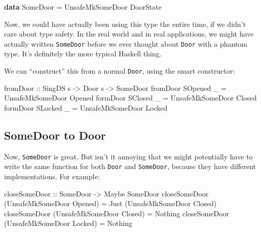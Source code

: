 \documentclass[]{article}
\newenvironment{Shaded}{}{}
\newcommand{\KeywordTok}[1]{\textcolor[rgb]{0.00,0.44,0.13}{\textbf{#1}}}
\newcommand{\DataTypeTok}[1]{\textcolor[rgb]{0.56,0.13,0.00}{#1}}
\newcommand{\OtherTok}[1]{\textcolor[rgb]{0.00,0.44,0.13}{#1}}
\newcommand{\FunctionTok}[1]{\textcolor[rgb]{0.02,0.16,0.49}{#1}}
\newcommand{\NormalTok}[1]{#1}
\begin{document}
\begin{Shaded}
\begin{Highlighting}[]
\KeywordTok{data} \DataTypeTok{SomeDoor} \FunctionTok{=} \DataTypeTok{UnsafeMkSomeDoor} \DataTypeTok{DoorState}
\end{Highlighting}
\end{Shaded}

Now, we could have actually been using this type the entire time, if we didn't
care about type safety. In the real world and in real applications, we might
have actually written \texttt{SomeDoor} before we ever thought about
\texttt{Door} with a phantom type. It's definitely the more typical Haskell
thing.

We can ``construct'' this from a normal \texttt{Door}, using the smart
constructor:

\begin{Shaded}
\begin{Highlighting}[]
\OtherTok{fromDoor ::} \DataTypeTok{SingDS}\NormalTok{ s }\OtherTok{->} \DataTypeTok{Door}\NormalTok{ s }\OtherTok{->} \DataTypeTok{SomeDoor}
\NormalTok{fromDoor }\DataTypeTok{SOpened}\NormalTok{ _ }\FunctionTok{=} \DataTypeTok{UnsafeMkSomeDoor} \DataTypeTok{Opened}
\NormalTok{formDoor }\DataTypeTok{SClosed}\NormalTok{ _ }\FunctionTok{=} \DataTypeTok{UnsafeMkSomeDoor} \DataTypeTok{Closed}
\NormalTok{formDoor }\DataTypeTok{SLocked}\NormalTok{ _ }\FunctionTok{=} \DataTypeTok{UnsafeMkSomeDoor} \DataTypeTok{Locked}
\end{Highlighting}
\end{Shaded}

\subsection{SomeDoor to Door}\label{somedoor-to-door}

Now, \texttt{SomeDoor} is great. But isn't it annoying that we might potentially
have to write the same function for both \texttt{Door} and \texttt{SomeDoor},
because they have different implementations. For example:

\begin{Shaded}
\begin{Highlighting}[]
\OtherTok{closeSomeDoor ::} \DataTypeTok{SomeDoor} \OtherTok{->} \DataTypeTok{Maybe} \DataTypeTok{SomeDoor}
\NormalTok{closeSomeDoor (}\DataTypeTok{UnsafeMkSomeDoor} \DataTypeTok{Opened}\NormalTok{) }\FunctionTok{=} \DataTypeTok{Just}\NormalTok{ (}\DataTypeTok{UnsafeMkSomeDoor} \DataTypeTok{Closed}\NormalTok{)}
\NormalTok{closeSomeDoor (}\DataTypeTok{UnsafeMkSomeDoor} \DataTypeTok{Closed}\NormalTok{) }\FunctionTok{=} \DataTypeTok{Nothing}
\NormalTok{closeSomeDoor (}\DataTypeTok{UnsafeMkSomeDoor} \DataTypeTok{Locked}\NormalTok{) }\FunctionTok{=} \DataTypeTok{Nothing}
\end{Highlighting}
\end{Shaded}
\end{document}
